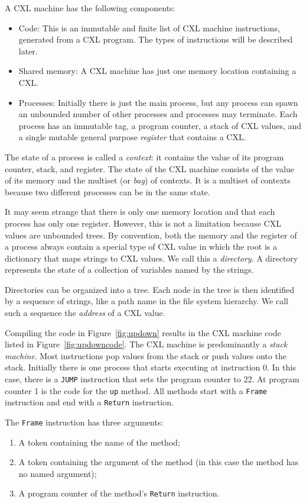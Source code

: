 \documentclass{book}
\begin{document}
A CXL machine has the following components:
\begin{itemize}
\item Code:  This is an immutable and finite list of CXL machine instructions,
generated from a CXL program.  The types of instructions will be described later.
\item Shared memory: A CXL machine has just one memory location containing
a CXL.
\item Processes:  Initially there is just the main process, but any process
can spawn an unbounded number of other processes and processes may terminate.
Each process has an immutable tag, a program counter, a stack of CXL values,
and a single mutable general purpose \emph{register} that contains a CXL.
\end{itemize}

The state of a process is called a \emph{context}: it contains the value of
its program counter, stack, and register.  The state of the CXL machine
consists of the value of its memory and the multiset (or \emph{bag}) of
contexts.  It is a multiset of contexts because two different processes can
be in the same state.

It may seem strange that there is only one memory location and that each
process has only one register.  However, this is not a limitation because
CXL values are unbounded trees.
By convention, both the memory and the register of a process always contain
a special type of CXL value in which the root is a dictionary
that maps strings to CXL values.  We call this a \emph{directory}.
A directory represents the state of a collection of variables named by the strings.

Directories can be organized into a tree.  Each node in the tree is then identified
by a sequence of strings, like a path name in the file system hierarchy.  We call
such a sequence the \emph{address} of a CXL value.

Compiling the code in Figure~\ref{fig:updown} results in the CXL machine code
listed in Figure~\ref{fig:updowncode}.
The CXL machine is predominantly a \emph{stack machine}.
Most instructions pop values from the stack or push values onto the stack.
Initially there is one process that starts executing at instruction 0.
In this case, there is a \texttt{JUMP} instruction that sets the program
counter to 22.  At program counter 1 is the code for the \texttt{up} method.
All methods start with a \texttt{Frame} instruction and end with a \texttt{Return}
instruction.

The \texttt{Frame} instruction has three arguments:
\begin{enumerate}
\item A token containing the name of the method;
\item A token containing the argument of the method (in this case the
method has no named argument);
\item A program counter of the method's \texttt{Return} instruction.
\end{enumerate}
\end{document}
